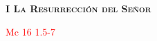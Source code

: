 \begin{center}
    \textbf{\textsc{I La Resurrección del Señor}}

    \textcolor{red}{Mc 16 1.5-7}
\end{center}


